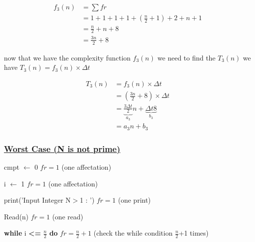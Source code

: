 \vspace{0.75cm}
\begin{align*}
f_3(n) &= \sum fr \\
     &= 1 + 1 + 1 + 1 + (\frac{n}{2}+1) + 2 + n + 1 \\
     &= \frac{n}{2} + n + 8 \\
     &= \boxed{\frac{3n}{2} + 8}
\end{align*}

\vspace{0.5cm}
now that we have the complexity function \(f_3(n)\) we need to find the \(T_3(n)\)  we have \(T_3(n) = f_3(n) \times \Delta t\)

\begin{align*}
T_3(n) &= f_3(n) \times \Delta t\\ 
&= (\frac{3n}{2} + 8) \times \Delta t \\
&= \underbrace{\frac{3 \Delta t}{2}}_{a_3} n + \underbrace{\Delta t 8}_{b_3} \\
&= \boxed{a_3n+b_3} 
\end{align*}

\subsubsection*{\underline{Worst Case (N is not prime)}}

\vspace{0.5cm}
cmpt $\gets$ 0  \hspace{4cm} \(fr = 1\) (one affectation)

\vspace{0.15cm}
i $\gets$ 1  \hspace{4.65cm} \(fr = 1\) (one affectation)

\vspace{0.15cm}
\textcolor{purplePlot!80!black}{print}(\textcolor{blueArea!60!black}{'Input Integer N\(>\)1 : '})  \hspace{0.95cm} \(fr = 1\) (one print)

\vspace{0.15cm}
\textcolor{purplePlot!80!black}{Read}(n)  \hspace{4.25cm} \(fr = 1\) (one read)

\vspace{0.15cm}

\textbf{while} i \textcolor{redPlot}{\textbf{\textless=}} \(\frac{n}{2}\)  \textbf{do} \hspace{2.7cm} \(fr = \frac{n}{2}+1\) (check the while condition \(\frac{n}{2}\)+1 times)


